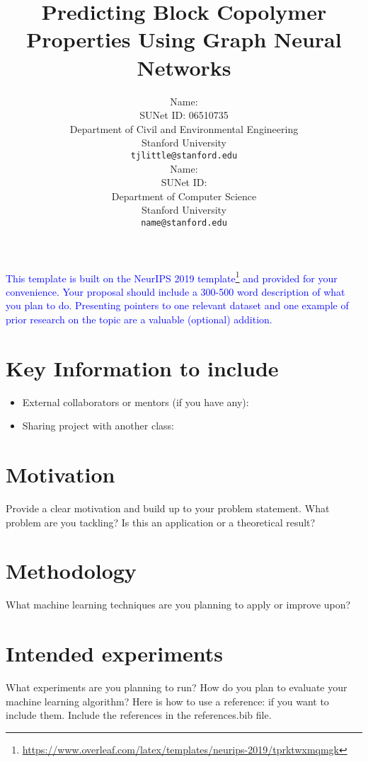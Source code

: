 \documentclass{article}
\title{
  Predicting Block Copolymer Properties Using Graph Neural Networks \\
}
\author{
  Name: \\
  SUNet ID: 06510735\\
  Department of Civil and Environmental Engineering \\
  Stanford University \\
  \texttt{tjlittle@stanford.edu} \\
  \And
  Name: \\
  SUNet ID: \\
  Department of Computer Science \\
  Stanford University \\
  \texttt{name@stanford.edu} \\
}
\newcommand{\note}[1]{\textcolor{blue}{{#1}}}
\begin{document}
\maketitle



\note{This template is built on the NeurIPS 2019 template\footnote{\url{https://www.overleaf.com/latex/templates/neurips-2019/tprktwxmqmgk}} and provided for your convenience. Your proposal should include a 300-500 word description of what you plan to do. Presenting pointers to one relevant dataset and one example of prior research on the topic are a valuable (optional) addition.}

\section{Key Information to include}

\begin{itemize}
    \item External collaborators or mentors (if you have any):
    \item Sharing project with another class:
\end{itemize}

\section{Motivation}
Provide a clear motivation and build up to your problem statement. What problem are you tackling? Is this an application or a theoretical result?

\section{Methodology}
What machine learning techniques are you planning to apply or improve upon?

\section{Intended experiments}
What experiments are you planning to run? How do you plan to evaluate your machine learning algorithm? Here is how to use a reference: \cite{attention_vaswani_17} if you want to include them. Include the references in the references.bib file.



\end{document}
